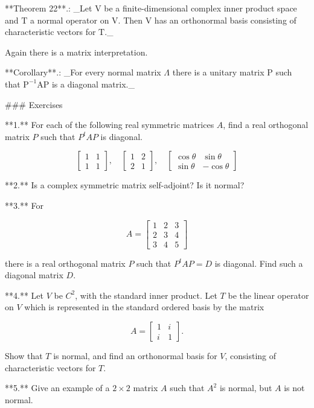 

**Theorem 22**.: _Let \(\mathrm{V}\) be a finite-dimensional complex inner product space and \(\mathrm{T}\) a normal operator on \(\mathrm{V}\). Then \(\mathrm{V}\) has an orthonormal basis consisting of characteristic vectors for \(\mathrm{T}\)._

Again there is a matrix interpretation.

**Corollary**.: _For every normal matrix \(\Lambda\) there is a unitary matrix \(\mathrm{P}\) such that \(\mathrm{P}^{-1}\mathrm{AP}\) is a diagonal matrix._

### Exercises

**1.** For each of the following real symmetric matrices \(A\), find a real orthogonal matrix \(P\) such that \(P^{t}AP\) is diagonal.

\[\begin{bmatrix}1&1\\ 1&1\end{bmatrix},\quad\begin{bmatrix}1&2\\ 2&1\end{bmatrix},\quad\begin{bmatrix}\cos\theta&\sin\theta\\ \sin\theta&-\cos\theta\end{bmatrix}\]

**2.** Is a complex symmetric matrix self-adjoint? Is it normal?

**3.** For

\[A=\begin{bmatrix}1&2&3\\ 2&3&4\\ 3&4&5\end{bmatrix}\]

there is a real orthogonal matrix \(P\) such that \(P^{t}AP=D\) is diagonal. Find such a diagonal matrix \(D\).

**4.** Let \(V\) be \(C^{2}\), with the standard inner product. Let \(T\) be the linear operator on \(V\) which is represented in the standard ordered basis by the matrix

\[A=\begin{bmatrix}1&i\\ i&1\end{bmatrix}.\]

Show that \(T\) is normal, and find an orthonormal basis for \(V\), consisting of characteristic vectors for \(T\).

**5.** Give an example of a \(2\times 2\) matrix \(A\) such that \(A^{2}\) is normal, but \(A\) is not normal.

